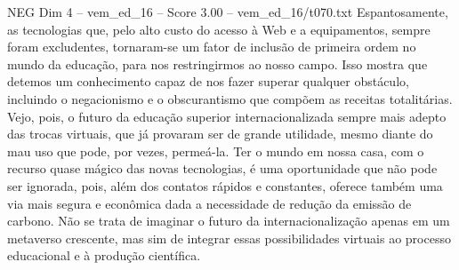 \begin{textsample}{NEG Dim 4 – vem\_ed\_16 – Score 3.00 – vem\_ed\_16/t070.txt}
Espantosamente, as tecnologias que, pelo alto custo do acesso à Web e a equipamentos, sempre foram excludentes, tornaram-se um fator de inclusão de primeira ordem no mundo da educação, para nos restringirmos ao nosso campo.
Isso mostra que detemos um conhecimento capaz de nos fazer superar qualquer obstáculo, incluindo o negacionismo e o obscurantismo que compõem as receitas totalitárias.
Vejo, pois, o futuro da educação superior internacionalizada sempre mais adepto das trocas virtuais, que já provaram ser de grande utilidade, mesmo diante do mau uso que pode, por vezes, permeá-la.
Ter o mundo em nossa casa, com o recurso quase mágico das novas tecnologias, é uma oportunidade que não pode ser ignorada, pois, além dos contatos rápidos e constantes, oferece também uma via mais segura e econômica dada a necessidade de redução da emissão de carbono.
Não se trata de imaginar o futuro da internacionalização apenas em um metaverso crescente, mas sim de integrar essas possibilidades virtuais ao processo educacional e à produção científica.

\end{textsample}
